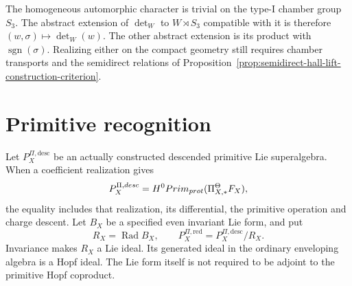 \begin{remark}
\label{rmk:ch6-S3-extension}
The homogeneous automorphic character is trivial on the type-I
chamber group \(S_3\).  The abstract extension of \(\det_W\) to
\(W\rtimes S_3\) compatible with it is therefore
\((w,\sigma)\mapsto\det_W(w)\).  The other abstract extension is
its product with \(\operatorname{sgn}(\sigma)\).  Realizing either
on the compact geometry still requires chamber transports and the
semidirect relations of
Proposition~\ref{prop:semidirect-hall-lift-construction-criterion}.
\end{remark}

\section{Primitive recognition}
\label{sec:ch6-primitive-recognition}

Let \(P_X^{\Pi,\mathrm{desc}}\) be an actually constructed descended
primitive Lie superalgebra.  When a coefficient realization gives
\[
 P_X^{\Pi,desc}
 =H^0Prim_{prot}
   (\Pi_{X,*}^{\Theta}F_X),
\]
the equality includes that realization, its differential, the
primitive operation and charge descent.  Let \(B_X\) be a specified
even invariant Lie form, and put
\[
 R_X=\operatorname{Rad}B_X,\qquad
 P_X^{\Pi,\mathrm{red}}=P_X^{\Pi,\mathrm{desc}}/R_X.
\]
Invariance makes \(R_X\) a Lie ideal.  Its generated ideal in the
ordinary enveloping algebra is a Hopf ideal.  The Lie form itself
is not required to be adjoint to the primitive Hopf coproduct.

